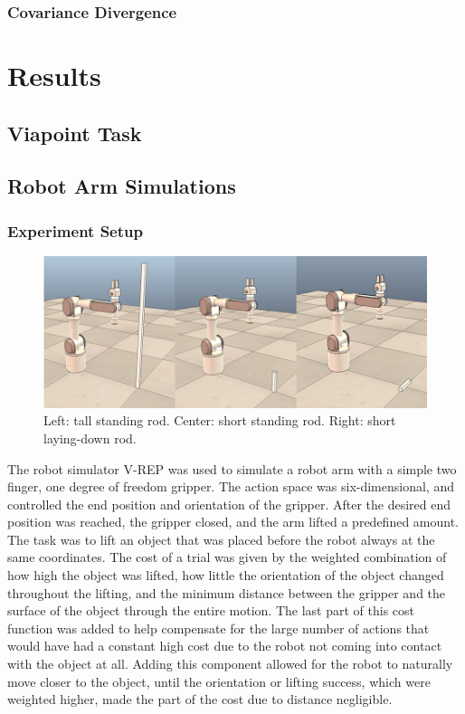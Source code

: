 \documentclass[12pt]{article}
\begin{document}
\subsubsection{Covariance Divergence}


\section{Results}

\subsection{Viapoint Task}

\subsection{Robot Arm Simulations}
\subsubsection{Experiment Setup}

\begin{figure}[ht]
  \centering
  \includegraphics[width=0.9\columnwidth]{robots.png}
  \caption{\label{fig_robots} Left: tall standing rod. Center: short standing rod. Right: short laying-down rod.
  \label{fig:robots}
  }
\end{figure}

The robot simulator V-REP was used to simulate a robot arm with a simple two finger, one degree of freedom gripper. The action space was six-dimensional, and controlled the end position and orientation of the gripper. After the desired end position was reached, the gripper closed, and the arm lifted a predefined amount. The task was to lift an object that was placed before the robot always at the same coordinates. The cost of a trial was given by the weighted combination of how high the object was lifted, how little the orientation of the object changed throughout the lifting, and the minimum distance between the gripper and the surface of the object through the entire motion. The last part of this cost function was added to help compensate for the large number of actions that would have had a constant high cost due to the robot not coming into contact with the object at all. Adding this component allowed for the robot to naturally move closer to the object, until the orientation or lifting success, which were weighted higher, made the part of the cost due to distance negligible. 
\end{document}
